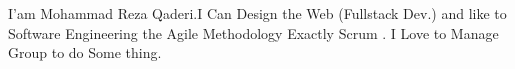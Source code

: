 

\begin{cvparagraph}
I'am Mohammad Reza Qaderi.I Can Design the Web (Fullstack Dev.) and like to Software Engineering the Agile Methodology Exactly Scrum . I Love to Manage Group to do Some thing.



\end{cvparagraph}
